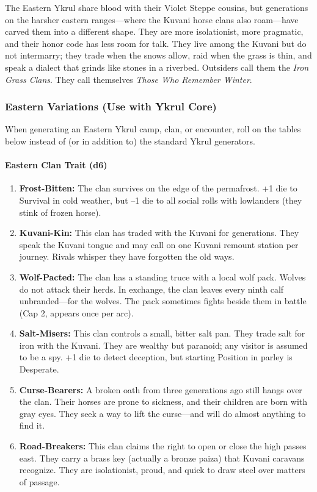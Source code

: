The Eastern Ykrul share blood with their Violet Steppe cousins, but generations on the harsher eastern ranges---where the Kuvani horse clans also roam---have carved them into a different shape. They are more isolationist, more pragmatic, and their honor code has less room for talk. They live among the Kuvani but do not intermarry; they trade when the snows allow, raid when the grass is thin, and speak a dialect that grinds like stones in a riverbed. Outsiders call them the \textit{Iron Grass Clans}. They call themselves \textit{Those Who Remember Winter}.

\subsubsection{Eastern Variations (Use with Ykrul Core)}
When generating an Eastern Ykrul camp, clan, or encounter, roll on the tables below instead of (or in addition to) the standard Ykrul generators.

\paragraph{Eastern Clan Trait (d6)}
\begin{enumerate}
  \item \textbf{Frost-Bitten:} The clan survives on the edge of the permafrost. +1 die to Survival in cold weather, but --1 die to all social rolls with lowlanders (they stink of frozen horse).
  \item \textbf{Kuvani-Kin:} This clan has traded with the Kuvani for generations. They speak the Kuvani tongue and may call on one Kuvani remount station per journey. Rivals whisper they have forgotten the old ways.
  \item \textbf{Wolf-Pacted:} The clan has a standing truce with a local wolf pack. Wolves do not attack their herds. In exchange, the clan leaves every ninth calf unbranded---for the wolves. The pack sometimes fights beside them in battle (Cap 2, appears once per arc).
  \item \textbf{Salt-Misers:} This clan controls a small, bitter salt pan. They trade salt for iron with the Kuvani. They are wealthy but paranoid; any visitor is assumed to be a spy. +1 die to detect deception, but starting Position in parley is Desperate.
  \item \textbf{Curse-Bearers:} A broken oath from three generations ago still hangs over the clan. Their horses are prone to sickness, and their children are born with gray eyes. They seek a way to lift the curse---and will do almost anything to find it.
  \item \textbf{Road-Breakers:} This clan claims the right to open or close the high passes east. They carry a brass key (actually a bronze paiza) that Kuvani caravans recognize. They are isolationist, proud, and quick to draw steel over matters of passage.
\end{enumerate}

